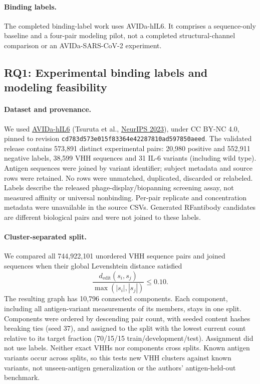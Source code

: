 \documentclass[11pt, logo, nonumbering]{preprint}
\begin{document}
\paragraph{Binding labels.}
The completed binding-label work uses AVIDa-hIL6. It comprises a sequence-only
baseline and a four-pair modeling pilot, not a completed structural-channel
comparison or an AVIDa-SARS-CoV-2 experiment.

\subsection{RQ1: Experimental binding labels and modeling feasibility}
\label{sec:rq1}

\paragraph{Dataset and provenance.}
We used \href{https://huggingface.co/datasets/COGNANO/AVIDa-hIL6}{AVIDa-hIL6}
(Tsuruta et al., \href{https://proceedings.neurips.cc/paper_files/paper/2023/file/8339dacd9df7ffe9623760f74169dd1e-Paper-Datasets_and_Benchmarks.pdf}{NeurIPS 2023}),
under CC BY-NC 4.0, pinned to revision
\nolinkurl{cd783d573e015f83364e42287810ad597850aeed}.
The validated release contains 573,891 distinct experimental pairs: 20,980
positive and 552,911 negative labels, 38,599 VHH sequences and 31 IL-6 variants
(including wild type). Antigen sequences were joined by variant identifier;
subject metadata and source rows were retained. No rows were unmatched,
duplicated, discarded or relabeled. Labels describe the released
phage-display/biopanning screening assay, not measured affinity or universal
nonbinding. Per-pair replicate and concentration metadata were unavailable in
the source CSVs. Generated RFantibody candidates are different biological pairs
and were not joined to these labels.

\paragraph{Cluster-separated split.}
We compared all 744,922,101 unordered VHH sequence pairs and joined sequences
when their global Levenshtein distance satisfied
\[
\frac{d_{\mathrm{edit}}(s_i,s_j)}{\max(|s_i|,|s_j|)}\leq0.10.
\]
The resulting graph has 10,796 connected components. Each component, including
all antigen-variant measurements of its members, stays in one split. Components
were ordered by descending pair count, with seeded content hashes breaking ties
(seed 37), and assigned to the split with the lowest current count relative to
its target fraction (70/15/15 train/development/test). Assignment did not use
labels. Neither exact VHHs nor components cross splits. Known antigen variants
occur across splits, so this tests new VHH clusters against known variants,
not unseen-antigen generalization or the authors' antigen-held-out benchmark.
\end{document}
